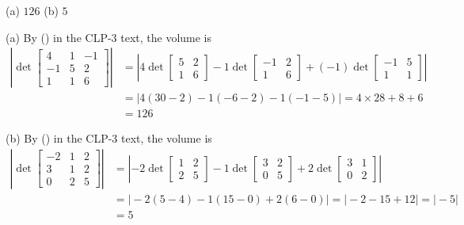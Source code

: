 \begin{answer}
(a) $126$\qquad
(b) $5$
\end{answer}

\begin{solution}
(a) 
By () in the CLP-3 text, the volume is 
\begin{align*}
\left| \det\left[\begin{matrix}
          4&1&-1 \\
         -1&5&2 \\
          1&1&6\end{matrix}\right] \right|
&=\left| 4\det\left[\begin{matrix}
          5&2 \\
          1&6 \end{matrix}\right]
        -1\det\left[\begin{matrix}
         -1&2 \\ 
          1&6 \end{matrix}\right]
        +(-1)\det\left[\begin{matrix}
         -1&5\\1&1\end{matrix}\right]\right| \\
&= \big|4(30-2)-1(-6-2)-1(-1-5)\big| = 4\times28+8+6\\
&=126
\end{align*}

(b)
By () in the CLP-3 text, the volume is 
\begin{align*}
\left|\det\left[\begin{matrix}
       -2&1&2\\
       3&1&2\\
       0&2&5\end{matrix}\right] \right|
&=\left|-2\det\left[\begin{matrix}
          1&2\\
          2&5\end{matrix}\right]
        -1\det\left[\begin{matrix}
          3&2\\
          0&5\end{matrix}\right]
       +2\det\left[\begin{matrix}
         3&1\\
         0&2\end{matrix}\right] \right|\\
&=\big|-2(5-4)-1(15-0)+2(6-0)\big| =\big|-2-15+12\big|=\big|-5\big|\\
&=5
\end{align*}
\end{solution}

